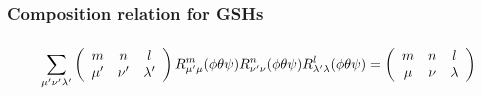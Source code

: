 \subsubsection*{Composition relation for GSHs}


\subsubsection*{
\begin{equation}
\sum_{\mu'\nu'\lambda'}\left(\protect\begin{array}{ccc}
m & n & l\protect\\
\mu' & \nu' & \lambda'
\protect\end{array}\right)R_{\mu'\mu}^{m}(\phi\theta\psi)R_{\nu'\nu}^{n}(\phi\theta\psi)R_{\lambda'\lambda}^{l}(\phi\theta\psi)=\left(\protect\begin{array}{ccc}
m & n & l\protect\\
\mu & \nu & \lambda
\protect\end{array}\right)\label{eq:gg.a91}
\end{equation}
}


\subsubsection*{
\[
\]
}

